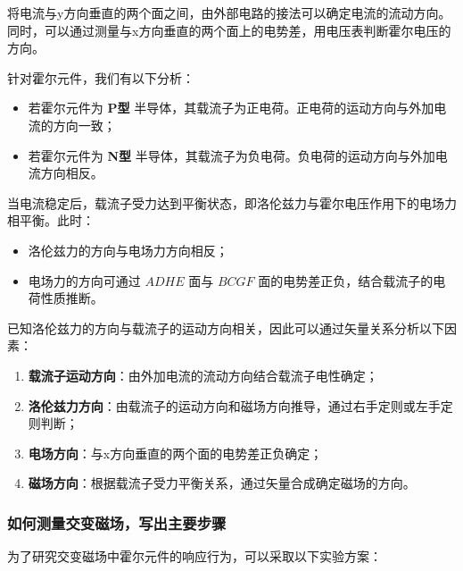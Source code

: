 \documentclass[UTF-8,twoside,cs4size]{ctexart}
\begin{document}
将电流与y方向垂直的两个面之间，由外部电路的接法可以确定电流的流动方向。同时，可以通过测量与x方向垂直的两个面上的电势差，用电压表判断霍尔电压的方向。 \par

针对霍尔元件，我们有以下分析：
\begin{itemize}
    \item 若霍尔元件为 \textbf{P型} 半导体，其载流子为正电荷。正电荷的运动方向与外加电流的方向一致； \par
    \item 若霍尔元件为 \textbf{N型} 半导体，其载流子为负电荷。负电荷的运动方向与外加电流方向相反。
\end{itemize}

当电流稳定后，载流子受力达到平衡状态，即洛伦兹力与霍尔电压作用下的电场力相平衡。此时：
\begin{itemize}
    \item 洛伦兹力的方向与电场力方向相反；
    \item 电场力的方向可通过 $ADHE$ 面与 $BCGF$ 面的电势差正负，结合载流子的电荷性质推断。
\end{itemize}

已知洛伦兹力的方向与载流子的运动方向相关，因此可以通过矢量关系分析以下因素：
\begin{enumerate}
    \item \textbf{载流子运动方向}：由外加电流的流动方向结合载流子电性确定；
    \item \textbf{洛伦兹力方向}：由载流子的运动方向和磁场方向推导，通过右手定则或左手定则判断；
    \item \textbf{电场方向}：与x方向垂直的两个面的电势差正负确定；
    \item \textbf{磁场方向}：根据载流子受力平衡关系，通过矢量合成确定磁场的方向。
\end{enumerate}

\subsubsection{如何测量交变磁场，写出主要步骤}
为了研究交变磁场中霍尔元件的响应行为，可以采取以下实验方案： \par
\end{document}
